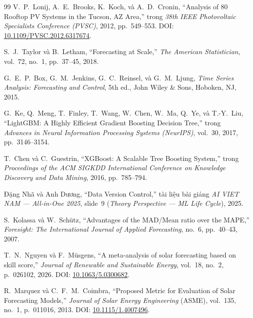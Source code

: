 \documentclass[12pt, a4paper]{report}
\begin{document}
\begin{thebibliography}{99}
V.~P.~Lonij, A.~E.~Brooks, K.~Koch, và A.~D.~Cronin,
\newblock ``Analysis of 80 Rooftop PV Systems in the Tucson, AZ Area,''
\newblock trong \textit{38th IEEE Photovoltaic Specialists Conference (PVSC)}, 2012, pp.~549--553.
\newblock DOI: \href{https://doi.org/10.1109/PVSC.2012.6317674}{10.1109/PVSC.2012.6317674}.

S.~J.~Taylor và B.~Letham,
\newblock ``Forecasting at Scale,''
\newblock \textit{The American Statistician}, vol.~72, no.~1, pp.~37--45, 2018.

G.~E.~P.~Box, G.~M.~Jenkins, G.~C.~Reinsel, và G.~M.~Ljung,
\newblock \textit{Time Series Analysis: Forecasting and Control}, 5th ed.,
\newblock John Wiley \& Sons, Hoboken, NJ, 2015.

G.~Ke, Q.~Meng, T.~Finley, T.~Wang, W.~Chen, W.~Ma, Q.~Ye, và T.-Y.~Liu,
\newblock ``LightGBM: A Highly Efficient Gradient Boosting Decision Tree,''
\newblock trong \textit{Advances in Neural Information Processing Systems (NeurIPS)}, vol.~30, 2017, pp.~3146--3154.

T.~Chen và C.~Guestrin,
\newblock ``XGBoost: A Scalable Tree Boosting System,''
\newblock trong \textit{Proceedings of the ACM SIGKDD International Conference on Knowledge Discovery and Data Mining}, 2016, pp.~785--794.

Đặng Nhã và Anh Dương,
\newblock ``Data Version Control,''
\newblock tài liệu bài giảng \textit{AI VIET NAM --- All-in-One 2025}, slide~9 (\textit{Theory Perspective --- ML Life Cycle}), 2025.

S.~Kolassa và W.~Schütz,
\newblock ``Advantages of the MAD/Mean ratio over the MAPE,''
\newblock \textit{Foresight: The International Journal of Applied Forecasting}, no.~6, pp.~40--43, 2007.

T.~N.~Nguyen và F.~Müsgens,
\newblock ``A meta-analysis of solar forecasting based on skill score,''
\newblock \textit{Journal of Renewable and Sustainable Energy}, vol.~18, no.~2, p.~026102, 2026.
\newblock DOI: \href{https://doi.org/10.1063/5.0300682}{10.1063/5.0300682}.

R.~Marquez và C.~F.~M.~Coimbra,
\newblock ``Proposed Metric for Evaluation of Solar Forecasting Models,''
\newblock \textit{Journal of Solar Energy Engineering} (ASME), vol.~135, no.~1, p.~011016, 2013.
\newblock DOI: \href{https://doi.org/10.1115/1.4007496}{10.1115/1.4007496}.


\end{thebibliography}
\end{document}
